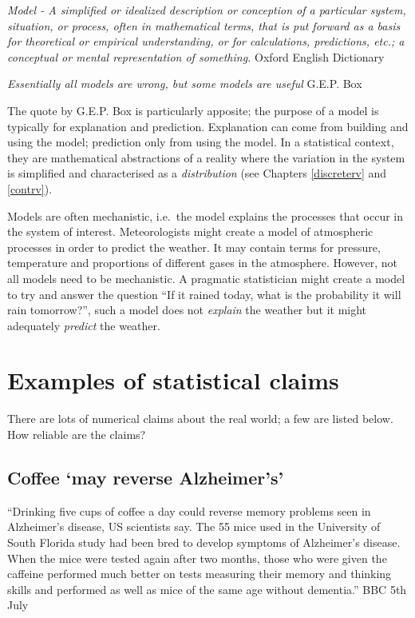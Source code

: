 \documentclass[
  oneside]{krantz}
\begin{document}
\emph{Model - A simplified or idealized description or conception of a particular system, situation, or process, often in mathematical terms, that is put forward as a basis for theoretical or empirical understanding, or for calculations, predictions, etc.; a conceptual or mental representation of something.}
Oxford English Dictionary \citeyearpar{dictionary1989oxford}

\emph{Essentially all models are wrong, but some models are useful}
G.E.P. Box \citeyearpar{Box1976}

The quote by G.E.P. Box is particularly apposite; the purpose of a model is typically for explanation and prediction. Explanation can come from building and using the model; prediction only from using the model. In a statistical context, they are mathematical abstractions of a reality where the variation in the system is simplified and characterised as a \emph{distribution} (see Chapters
\ref{discreterv} and \ref{contrv}).

Models are often mechanistic, i.e.~the model explains the processes that occur in the system of interest. Meteorologists might create a model of atmospheric processes in order to predict the weather. It may contain terms for pressure, temperature and proportions of different gases in the atmosphere. However, not all models need to be mechanistic. A pragmatic statistician might create a model to try and answer the question ``If it rained today, what is the probability it will rain tomorrow?'', such a model does not \emph{explain} the weather but it might adequately \emph{predict} the weather.

\hypertarget{examples-of-statistical-claims}{%
\section{Examples of statistical claims}\label{examples-of-statistical-claims}}

There are lots of numerical claims about the real world; a few are listed below. How reliable are the claims?

\hypertarget{coffee-may-reverse-alzheimers}{%
\subsection{Coffee `may reverse Alzheimer's'}\label{coffee-may-reverse-alzheimers}}

``Drinking five cups of coffee a day could reverse memory problems seen in Alzheimer's disease, US scientists say. The 55 mice used in the University of South Florida study had been bred to develop symptoms of Alzheimer's disease. When the mice were tested again after two months, those who were given the caffeine performed much better on tests measuring their memory and thinking skills and performed as well as mice of the same age without dementia.''
BBC 5th July \citeyearpar{BBC1}
\end{document}
